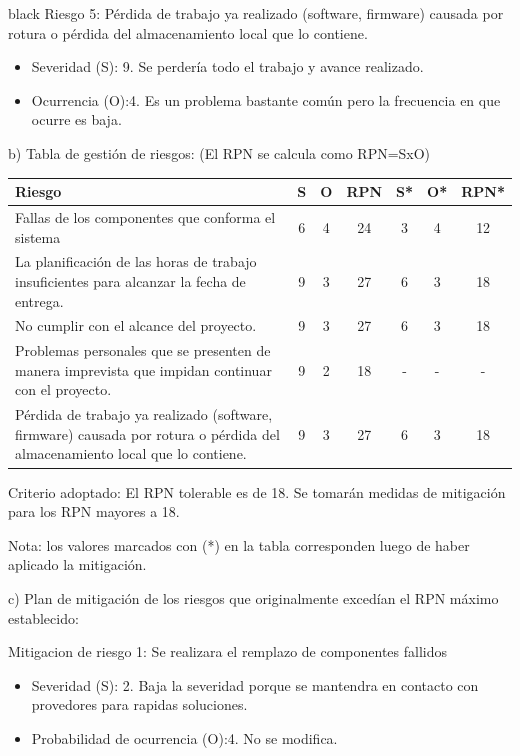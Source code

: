 \documentclass[
11pt, %
codirector, %
]{charter}
\begin{document}
\begin{consigna}{black}
Riesgo 5: Pérdida de trabajo ya realizado (software, firmware) causada por rotura o pérdida del almacenamiento local que lo contiene.
\begin{itemize}
	\item Severidad (S):  9. Se perdería todo el trabajo y avance realizado.
	\item Ocurrencia (O):4. Es un problema bastante común pero la frecuencia en que ocurre es baja.
\end{itemize}

b) Tabla de gestión de riesgos:      (El RPN se calcula como RPN=SxO)

\begin{table}[htpb]
\centering
\begin{tabularx}{\linewidth}{@{}|X|c|c|c|c|c|c|@{}}
\hline
\rowcolor[HTML]{C0C0C0} 
Riesgo & S & O & RPN & S* & O* & RPN* \\ \hline
    Fallas de los componentes que conforma el sistema   & 6  & 4  &  24  & 3   & 4   &12      \\ \hline
    La planificación de las horas de trabajo insuficientes para alcanzar la fecha de entrega.   &  9 & 3  &  27   &  6  & 3   &  18    \\ \hline
    No cumplir con el alcance del proyecto.  &  9 & 3  &  27   &  6  &   3 &   18   \\ \hline
    Problemas personales que se presenten de manera imprevista que impidan continuar con el proyecto.  &  9 &  2 &  18   &  -  & -   &   -   \\ \hline
    Pérdida de trabajo ya realizado (software, firmware) causada por rotura o pérdida del almacenamiento local que lo contiene.   &  9 & 3  &   27  &   6 &   3 &    18  \\ \hline
\end{tabularx}%
\end{table}

Criterio adoptado: 
El RPN tolerable es de 18. Se tomarán medidas de mitigación para los RPN mayores a 18.

Nota: los valores marcados con (*) en la tabla corresponden luego de haber aplicado la mitigación.

c) Plan de mitigación de los riesgos que originalmente excedían el RPN máximo establecido:
 
Mitigacion de riesgo 1: Se realizara el remplazo de componentes fallidos
\begin{itemize}
	\item Severidad (S):  2. Baja la severidad porque se mantendra en contacto con provedores para rapidas soluciones.
	\item Probabilidad de ocurrencia (O):4. No se modifica.
\end{itemize}


\end{consigna}
\end{document}
